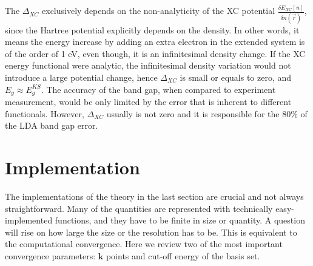 The $\Delta_{XC}$ exclusively depends on the non-analyticity of the XC potential $\frac{\delta E_{XC}[n]}{\delta n(\vec{r})}$, since the Hartree potential explicitly depends on the density. In other words, it means the energy increase by adding an extra electron in the extended system is of the order of 1 eV, even though, it is an infinitesimal density change. If the XC energy functional were analytic, the infinitesimal density variation would not introduce a large potential change, hence $\Delta_{XC}$ is small or equals to zero, and $E_g \approx E^{KS}_g$. The accuracy of the band gap, when compared to experiment measurement, would be only limited by the error that is inherent to different functionals. However, $\Delta_{XC}$ usually is not zero and it is responsible for the 80\% of the LDA band gap error\cite{Godby1988}. 
\section{Implementation}
The implementations of the theory in the last section are crucial and not always straightforward. Many of the quantities are represented with technically easy-implemented functions, and they have to be finite in size or quantity. A question will rise on how large the size or the resolution has to be. This is equivalent to the computational convergence. Here we review two of the most important convergence parameters: $\mathbf{k}$ points and cut-off energy of the basis set.
